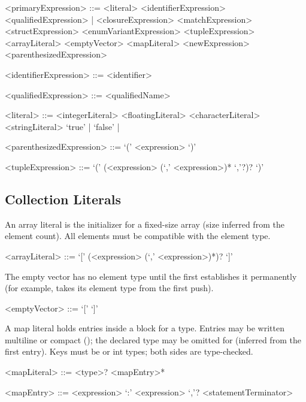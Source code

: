 \documentclass[makeidx]{article}
\begin{document}
\begin{grammar}
<primaryExpression> ::= <literal>
  \alt <identifierExpression>
  \alt <qualifiedExpression>
  \alt \THIS{} | \SUPER{}
  \alt <closureExpression>
  \alt <matchExpression>
  \alt <structExpression>
  \alt <enumVariantExpression>
  \alt <tupleExpression>
  \alt <arrayLiteral>
  \alt <emptyVector>
  \alt <mapLiteral>
  \alt <newExpression>
  \alt <parenthesizedExpression>

<identifierExpression> ::= <identifier>

<qualifiedExpression> ::= <qualifiedName>

<literal> ::= <integerLiteral>
  \alt <floatingLiteral>
  \alt <characterLiteral>
  \alt <stringLiteral>
  \alt `true' | `false' | \NULL{}

<parenthesizedExpression> ::= `(' <expression> `)'

<tupleExpression> ::= `(' (<expression> (`,' <expression>)* `,'?)? `)'
\end{grammar}

\subsection{Collection Literals}

\LMHash{}%
An array literal is the initializer for a  fixed-size
array (size inferred from the element count). All elements must be
compatible with the element type.

\begin{grammar}
<arrayLiteral> ::= `[' (<expression> (`,' <expression>)*)? `]'
\end{grammar}

\LMHash{}%
The empty vector  has no element type until the first
 establishes it permanently (for example,
 takes its element type from the first push).

\begin{grammar}
<emptyVector> ::= \VEC{} `[' `]'
\end{grammar}

\LMHash{}%
A map literal holds  entries inside a 
block for a  type. Entries may be written multiline
or compact (); the declared type may
be omitted for  (inferred from the first entry). Keys must
be  or int types; both sides are type-checked.

\begin{grammar}
<mapLiteral> ::= <type>? \HAS{} <mapEntry>* \END{}

<mapEntry> ::= <expression> `:' <expression> `,'? <statementTerminator>
\end{grammar}
\end{document}
